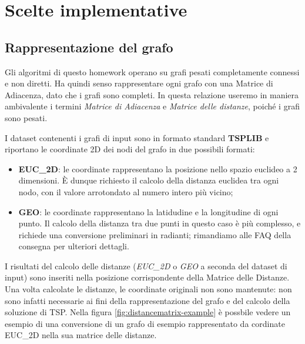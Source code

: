 \section{Scelte implementative}
\label{cap:implementation-choices}

\subsection{Rappresentazione del grafo}
\label{sub:graph-representation}

Gli algoritmi di questo homework operano su grafi pesati completamente connessi e non diretti. Ha quindi senso rappresentare ogni grafo con una Matrice di Adiacenza, dato che i grafi sono completi. In questa relazione useremo in maniera ambivalente i termini \textit{Matrice di Adiacenza} e \textit{Matrice delle distanze}, poiché i grafi sono pesati.

\noindent I dataset contenenti i grafi di input sono in formato standard \textbf{TSPLIB } e riportano le coordinate 2D dei nodi del grafo in due possibili formati:

\begin{itemize}
    \item \textbf{EUC\_2D}: le coordinate rappresentano la posizione nello spazio euclideo a 2 dimensioni. È dunque richiesto il calcolo della distanza euclidea tra ogni nodo, con il valore arrotondato al numero intero più vicino;
    \item \textbf{GEO}: le coordinate rappresentano la latidudine e la longitudine di ogni punto. Il calcolo della distanza tra due punti in questo caso è più complesso, e richiede una conversione preliminari in radianti; rimandiamo alle FAQ della consegna per ulteriori dettagli.
\end{itemize}

\noindent I risultati del calcolo delle distanze (\textit{EUC\_2D} o \textit{GEO} a seconda del dataset di input) sono inseriti nella posizione corrispondente della Matrice delle Distanze.
Una volta calcolate le distanze, le coordinate originali non sono mantenute: non sono infatti necessarie ai fini della rappresentazione del grafo e del calcolo della soluzione di TSP.
Nella figura \ref{fig:distancematrix-example} è possbile vedere un esempio di una conversione di un grafo di esempio rappresentato da cordinate EUC\_2D nella sua matrice delle distanze.

